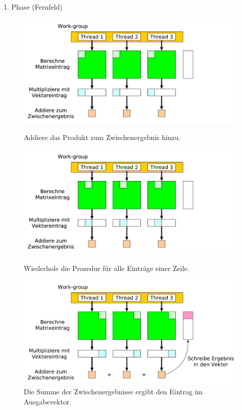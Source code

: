 \documentclass[10pt]{beamer}
\begin{document}
\begin{frame}{1. Phase (Fernfeld)}
\begin{figure}
\begin{overprint}
        \centering
        \includegraphics[width=\linewidth]{figures/fg-ff-add-interim-result.pdf}
        \caption{Addiere das Produkt zum Zwischenergebnis hinzu.}
        \centering
        \includegraphics[width=\linewidth]{figures/fg-ff-next-column.pdf}
        \caption{Wiederhole die Prozedur f\"ur alle Eintr\"age einer Zeile.}
        \centering
        \includegraphics[width=\linewidth]{figures/fg-ff-write-result.pdf}
        \caption{Die Summe der Zwischenergebnisse ergibt den Eintrag im
                 Ausgabevektor.}
    \end{overprint}
  \end{figure}
\end{frame}
\end{document}
